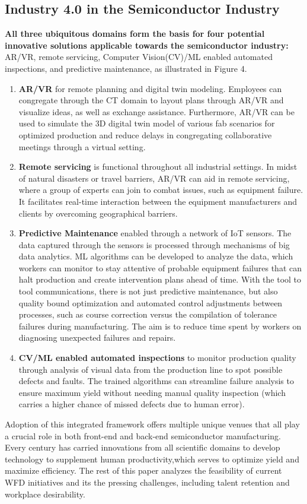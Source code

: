 \subsection{Industry 4.0 in the Semiconductor Industry}\label{sec3_5:industry_4_semiconductor_industry}
\textbf{All three ubiquitous domains form the basis for four potential innovative solutions applicable towards the semiconductor industry:} AR/VR, remote servicing, Computer Vision(CV)/ML enabled automated inspections, and predictive maintenance, as illustrated in Figure 4.
\begin{enumerate}
    \item \textbf{AR/VR }for remote planning and digital twin modeling. Employees can congregate through the CT domain to layout plans through AR/VR and visualize ideas, as well as exchange assistance. Furthermore, AR/VR can be used to simulate the 3D digital twin model of various fab scenarios for optimized production and reduce delays in congregating collaborative meetings through a virtual setting.
    \item \textbf{Remote servicing }is functional throughout all industrial settings. In midst of natural disasters or travel barriers, AR/VR can aid in remote servicing, where a group of experts can join to combat issues, such as equipment failure. It facilitates real-time interaction between the equipment manufacturers and clients by overcoming geographical barriers.
    \item \textbf{Predictive Maintenance }enabled through a network of IoT sensors. The data captured through the sensors is processed through mechanisms of big data analytics. ML algorithms can be developed to analyze the data, which workers can monitor to stay attentive of probable equipment failures that can halt production and create intervention plans ahead of time. With the tool to tool communications, there is not just predictive maintenance, but also  quality bound optimization and automated control adjustments between processes, such as course correction versus the compilation of tolerance failures during manufacturing. The aim is to reduce time spent by workers on diagnosing unexpected failures and repairs.
    \item \textbf{CV/ML enabled automated inspections  }to monitor production quality through analysis of visual data from the production line to spot possible defects and faults. The trained algorithms can streamline failure analysis to ensure maximum yield without needing manual quality inspection (which carries a higher chance of missed defects due to human error).
\end{enumerate}
Adoption of this integrated framework offers multiple unique venues that all play a crucial role in both front-end and back-end semiconductor manufacturing. Every century has carried innovations from all scientific domains to develop technology to supplement human productivity,which serves to optimize yield and maximize efficiency. The rest of this paper analyzes the feasibility of current WFD initiatives and its the pressing challenges, including talent retention and workplace desirability. 
